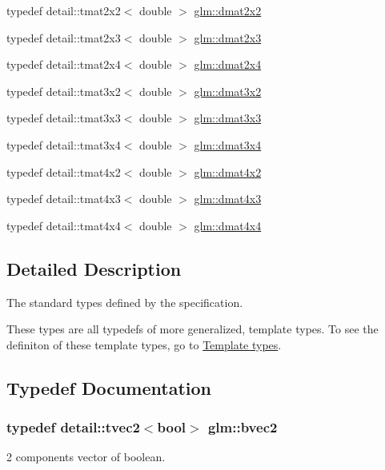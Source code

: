 \begin{DoxyCompactItemize}
\item 
typedef detail\+::tmat2x2$<$ double $>$ \hyperlink{group__core__types_ga2c1de969d1d8cfcb297dbfa476b33dc8}{glm\+::dmat2x2}
\item 
typedef detail\+::tmat2x3$<$ double $>$ \hyperlink{group__core__types_gadba2f0efb492f511466de9784b0e07cd}{glm\+::dmat2x3}
\item 
typedef detail\+::tmat2x4$<$ double $>$ \hyperlink{group__core__types_gaa97c63383e2dc472510d77409a7d5001}{glm\+::dmat2x4}
\item 
typedef detail\+::tmat3x2$<$ double $>$ \hyperlink{group__core__types_ga44d603bc9ed3688928f508fb161c71f0}{glm\+::dmat3x2}
\item 
typedef detail\+::tmat3x3$<$ double $>$ \hyperlink{group__core__types_ga415251df22cffb39bc14078ff057a6c3}{glm\+::dmat3x3}
\item 
typedef detail\+::tmat3x4$<$ double $>$ \hyperlink{group__core__types_ga9ec18b898499ad524dc93f2d4d78b877}{glm\+::dmat3x4}
\item 
typedef detail\+::tmat4x2$<$ double $>$ \hyperlink{group__core__types_gaec598e6dda8b2119877d992f5e0c1bae}{glm\+::dmat4x2}
\item 
typedef detail\+::tmat4x3$<$ double $>$ \hyperlink{group__core__types_ga47f7b642f84d1272a0dafa221c8fd720}{glm\+::dmat4x3}
\item 
typedef detail\+::tmat4x4$<$ double $>$ \hyperlink{group__core__types_gaa505ead5e0b6d8bc504ccfeadbac83d5}{glm\+::dmat4x4}
\end{DoxyCompactItemize}


\subsection{Detailed Description}
The standard types defined by the specification. 

These types are all typedefs of more generalized, template types. To see the definiton of these template types, go to \hyperlink{group__core__template}{Template types}. 

\subsection{Typedef Documentation}
\hypertarget{group__core__types_ga0b5729ae4f7b2767a18bb96b7152c072}{}
\subsubsection[{bvec2}]{\setlength{\rightskip}{0pt plus 5cm}typedef detail\+::tvec2$<$bool$>$ {\bf glm\+::bvec2}}\label{group__core__types_ga0b5729ae4f7b2767a18bb96b7152c072}
2 components vector of boolean.

